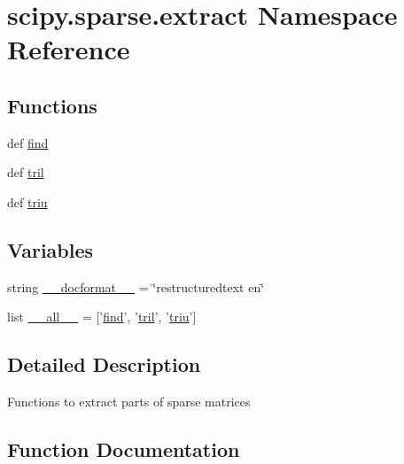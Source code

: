 \hypertarget{namespacescipy_1_1sparse_1_1extract}{}\section{scipy.\+sparse.\+extract Namespace Reference}
\label{namespacescipy_1_1sparse_1_1extract}
\subsection*{Functions}
\begin{DoxyCompactItemize}
\item 
def \hyperlink{namespacescipy_1_1sparse_1_1extract_a67a3e79fe5fdbf1882c8585a6bdb139e}{find}
\item 
def \hyperlink{namespacescipy_1_1sparse_1_1extract_ad0191f1f2ef15642796db71cea11e9dc}{tril}
\item 
def \hyperlink{namespacescipy_1_1sparse_1_1extract_a53b57a1c28df53373531eed3ce413f1f}{triu}
\end{DoxyCompactItemize}
\subsection*{Variables}
\begin{DoxyCompactItemize}
\item 
string \hyperlink{namespacescipy_1_1sparse_1_1extract_a5df11b961e462d2e33ae77a27a533128}{\+\_\+\+\_\+docformat\+\_\+\+\_\+} = \char`\"{}restructuredtext en\char`\"{}
\item 
list \hyperlink{namespacescipy_1_1sparse_1_1extract_aa3aea85848a333e36eeec638e156d6a1}{\+\_\+\+\_\+all\+\_\+\+\_\+} = \mbox{[}'\hyperlink{namespacescipy_1_1sparse_1_1extract_a67a3e79fe5fdbf1882c8585a6bdb139e}{find}', '\hyperlink{namespacescipy_1_1sparse_1_1extract_ad0191f1f2ef15642796db71cea11e9dc}{tril}', '\hyperlink{namespacescipy_1_1sparse_1_1extract_a53b57a1c28df53373531eed3ce413f1f}{triu}'\mbox{]}
\end{DoxyCompactItemize}


\subsection{Detailed Description}
\begin{DoxyVerb}Functions to extract parts of sparse matrices
\end{DoxyVerb}
 

\subsection{Function Documentation}
\hypertarget{namespacescipy_1_1sparse_1_1extract_a67a3e79fe5fdbf1882c8585a6bdb139e}{}
